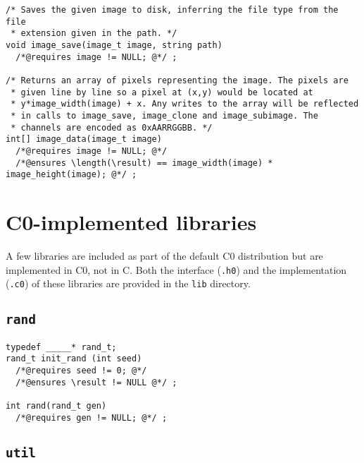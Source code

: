 \documentclass[11pt]{article}
\begin{document}
\begin{small}
\begin{verbatim}
/* Saves the given image to disk, inferring the file type from the file
 * extension given in the path. */
void image_save(image_t image, string path)
  /*@requires image != NULL; @*/ ;

/* Returns an array of pixels representing the image. The pixels are
 * given line by line so a pixel at (x,y) would be located at
 * y*image_width(image) + x. Any writes to the array will be reflected
 * in calls to image_save, image_clone and image_subimage. The
 * channels are encoded as 0xAARRGGBB. */
int[] image_data(image_t image)
  /*@requires image != NULL; @*/
  /*@ensures \length(\result) == image_width(image) * image_height(image); @*/ ;
\end{verbatim}
\end{small}

\section{C0-implemented libraries}

A few libraries are included as part of the default C0 distribution
but are implemented in C0, not in C. Both the interface (\verb'.h0')
and the implementation (\verb'.c0') of these libraries are provided in
the \verb'lib' directory.

\subsection{\tt rand}

\begin{small}
\begin{verbatim}
typedef _____* rand_t;
rand_t init_rand (int seed)
  /*@requires seed != 0; @*/ 
  /*@ensures \result != NULL @*/ ;

int rand(rand_t gen)
  /*@requires gen != NULL; @*/ ;
\end{verbatim}
\end{small}

\subsection{\tt util}
\end{document}
